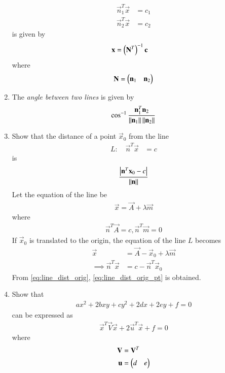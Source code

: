 \begin{enumerate}[label=\arabic*.,ref=\thesubsection.\theenumi]
\begin{align}
\vec{n}_1^T\vec{x} &=c_1
\\
\vec{n}_2^T\vec{x} &=c_2
\end{align}
is given by 
\begin{align}
\mathbf{x} &=\left(\mathbf{N}^T\right)^{-1}\mathbf{c}
\end{align}
where 
\begin{align}
\mathbf{N} = \begin{pmatrix}\mathbf{n}_1 & \mathbf{n}_2\end{pmatrix}
\end{align}
\item The {\em angle between two lines} is given by 
\begin{align}
\cos ^{-1} \frac{\mathbf{n}_1 ^T \mathbf{n}_2}{\left\lVert\mathbf{n}_1\right\rVert  \left\lVert\mathbf{n}_2\right\rVert}
\end{align}
\item Show that the distance of a point $\vec{x}_0$ from the line 
\begin{align}
L: \quad \vec{n}^T\vec{x} &=c
\end{align}
is 
\begin{align}
\frac{\left\vert\mathbf{n}^T\mathbf{x}_0-c\right\vert}{\left\lVert\mathbf{n}\right\rVert} 
\end{align}
\solution Let the equation of the line be 
\begin{align}
\vec{x} = \vec{A} + \lambda \vec{m}
\end{align}
%
where 
\begin{align}
\label{eq:line_dist_orig_pt}
\vec{n}^T\vec{A} = c, \vec{n}^T\vec{m} = 0
\end{align}
If $\vec{x}_0$ is translated to the origin, the equation of the line $L$ becomes 
\begin{align}
\vec{x} &= \vec{A}- \vec{x}_0+ \lambda \vec{m}
\\
\implies 
\vec{n}^T\vec{x} &=c-\vec{n}^T\vec{x}_0
\end{align}
From \eqref{eq:line_dist_orig}, \eqref{eq:line_dist_orig_pt} is obtained.
\item Show that 
\begin{align}
ax^2+2bxy+cy^2+2dx+2ey+f=0
\end{align}
can be expressed as
\begin{align}
\label{eq:quad_form}
\vec{x}^T\vec{V}\vec{x}+2\vec{u}^T\vec{x}+f=0
\end{align}
%
where
\begin{align}
\mathbf{V} &= \mathbf{V}^T
\\
\mathbf{u} &= \begin{pmatrix}d & e\end{pmatrix}
\end{align}


\end{enumerate}
